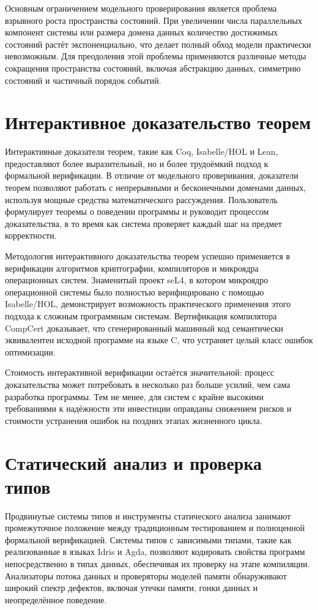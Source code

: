 \documentclass[
    language=russian,
    doctype=article,
]{../../omnilatex}
\begin{document}
Основным ограничением модельного проверирования является проблема взрывного роста пространства состояний. При увеличении числа параллельных компонент системы или размера домена данных количество достижимых состояний растёт экспоненциально, что делает полный обход модели практически невозможным. Для преодоления этой проблемы применяются различные методы сокращения пространства состояний, включая абстракцию данных, симметрию состояний и частичный порядок событий.

\section{Интерактивное доказательство теорем}
Интерактивные доказатели теорем, такие как Coq, Isabelle/HOL и Lean, предоставляют более выразительный, но и более трудоёмкий подход к формальной верификации. В отличие от модельного проверивания, доказатели теорем позволяют работать с непрерывными и бесконечными доменами данных, используя мощные средства математического рассуждения. Пользователь формулирует теоремы о поведении программы и руководит процессом доказательства, в то время как система проверяет каждый шаг на предмет корректности.

Методология интерактивного доказательства теорем успешно применяется в верификации алгоритмов криптографии, компиляторов и микроядра операционных систем. Знаменитый проект seL4, в котором микроядро операционной системы было полностью верифицировано с помощью Isabelle/HOL, демонстрирует возможность практического применения этого подхода к сложным программным системам. Вертификация компилятора CompCert доказывает, что сгенерированный машинный код семантически эквивалентен исходной программе на языке C, что устраняет целый класс ошибок оптимизации.

Стоимость интерактивной верификации остаётся значительной: процесс доказательства может потребовать в несколько раз больше усилий, чем сама разработка программы. Тем не менее, для систем с крайне высокими требованиями к надёжности эти инвестиции оправданы снижением рисков и стоимости устранения ошибок на поздних этапах жизненного цикла.

\section{Статический анализ и проверка типов}
Продвинутые системы типов и инструменты статического анализа занимают промежуточное положение между традиционным тестированием и полноценной формальной верификацией. Системы типов с зависимыми типами, такие как реализованные в языках Idris и Agda, позволяют кодировать свойства программ непосредственно в типах данных, обеспечивая их проверку на этапе компиляции. Анализаторы потока данных и проверяторы моделей памяти обнаруживают широкий спектр дефектов, включая утечки памяти, гонки данных и неопределённое поведение.
\end{document}
